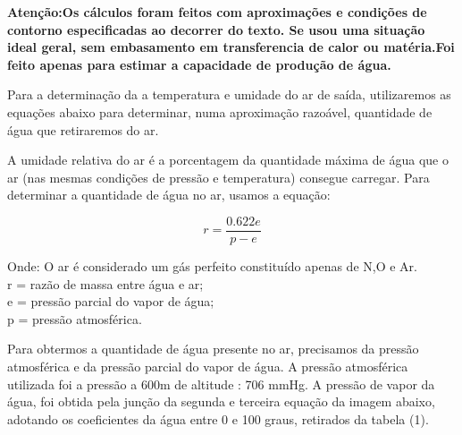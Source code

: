 \textbf{Atenção:Os cálculos foram feitos com aproximações e condições de contorno especificadas ao 
decorrer do texto. Se usou uma situação ideal geral, sem embasamento em transferencia de calor ou 
matéria.Foi feito apenas para estimar a capacidade de produção de água.}

Para a determinação da a temperatura e umidade do ar de saída, utilizaremos as equações abaixo 
para determinar, numa aproximação razoável, quantidade de água que retiraremos do ar.   

A umidade relativa do ar é a porcentagem da quantidade máxima de água que o ar (nas mesmas 
condições de pressão e temperatura) consegue carregar.
Para determinar a quantidade de água no ar, usamos a equação:

\begin{equation}
 r = \frac{0.622e}{p - e}
\end{equation}

Onde: O ar é considerado um gás perfeito constituído apenas de N,O e Ar.\\
r = razão de massa entre água e ar;\\
e = pressão parcial do vapor de água;\\
p = pressão atmosférica.

Para obtermos a quantidade de água presente no ar, precisamos da pressão atmosférica e da 
pressão parcial do vapor de água. A pressão atmosférica utilizada foi a pressão a 600m de altitude : 706 
mmHg. A pressão de vapor da água, foi obtida pela junção da segunda e terceira equação da imagem 
abaixo, adotando os coeficientes da água entre 0 e 100 graus, retirados da tabela (1).